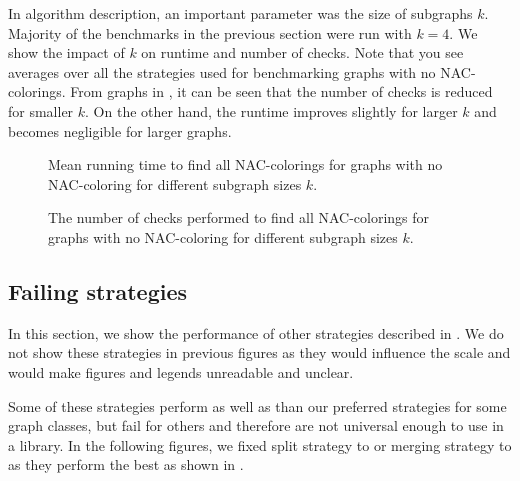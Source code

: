 In \Subgraphs{} algorithm description, an important parameter was the size of subgraphs \( k \).
Majority of the benchmarks in the previous section were run with \( k = 4 \).
%
We show the impact of	\( k \) on runtime and number of checks.
Note that you see averages over all the strategies used for benchmarking
graphs with no NAC-colorings.
%
From graphs in ,
it can be seen that the number of checks is reduced for smaller \( k \).
On the other hand, the runtime improves slightly for larger \( k \)
and becomes negligible for larger graphs.

\begin{figure}[thbp]
	\centering
	\scalebox{\BenchFigureScale}{}
	\caption[Mean runtime for graphs with no NAC-coloring]{
		Mean running time to find all NAC-colorings for graphs with no NAC-coloring for different subgraph sizes \( k \).}%
	\label{fig:graph_no_nac_coloring_first_runtime_subgraph_size}
\end{figure}%
\begin{figure}[thbp]
	\centering
	\scalebox{\BenchFigureScale}{}
	\caption[Checks performed for graphs with no NAC-coloring]{
		The number of checks performed to find all NAC-colorings for graphs with no NAC-coloring for different subgraph sizes \( k \).}%
	\label{fig:graph_no_nac_coloring_first_checks_subgraph_size}
\end{figure}%



\subsection{Failing strategies}%
\label{sec:failing_strategies}

In this section, we show the performance of other strategies described in .
We do not show these strategies in previous figures as they would influence
the scale and would make figures and legends unreadable and unclear.

Some of these strategies perform as well as
than our preferred strategies for some graph classes,
but fail for others and therefore are not universal enough to use in a library.
%
In the following figures, we fixed
split strategy to \Neighbors{} or merging strategy to \MergeLinear{}
as they perform the best as shown in .

